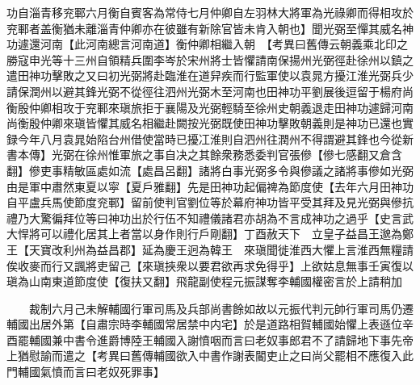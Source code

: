 功自淄青移兖鄆六月衡自賓客為常侍七月仲卿自左羽林大將軍為光祿卿而得相攻於兖鄆者盖衡猶未離淄青仲卿亦在彼雖有新除官皆未肯入朝也】聞光弼至憚其威名神功遽還河南【此河南總言河南道】衡仲卿相繼入朝　【考異曰舊傳云朝義乘北印之勝寇申光等十三州自領精兵圍李岑於宋州將士皆懼請南保揚州光弼徑赴徐州以鎮之遣田神功擊敗之又曰初光弼將赴臨淮在道舁疾而行監軍使以袁晁方擾江淮光弼兵少請保潤州以避其鋒光弼不從徑往泗州光弼木至河南也田神功平劉展後逗留于楊府尚衡殷仲卿相攻于兖鄆來瑱旅拒于襄陽及光弼輕騎至徐州史朝義退走田神功遽歸河南尚衡殷仲卿來瑱皆懼其威名相繼赴闕按光弼既使田神功擊敗朝義則是神功已還也實録今年八月袁晁始陷台州借使當時已擾冮淮則自泗州往潤州不得謂避其鋒也今從新書本傳】光弼在徐州惟軍旅之事自决之其餘衆務悉委判官張傪【傪七感翻又倉含翻】傪吏事精敏區處如流【處昌呂翻】諸將白事光弼多令與傪議之諸將事傪如光弼由是軍中肅然東夏以寜【夏戶雅翻】先是田神功起偏禆為節度使【去年六月田神功自平盧兵馬使節度兖鄆】留前使判官劉位等於幕府神功皆平受其拜及見光弼與傪抗禮乃大驚徧拜位等曰神功出於行伍不知禮儀諸君亦胡為不言成神功之過乎【史言武大悍將可以禮化居其上者當以身作則行戶剛翻】丁酉赦天下　立皇子益昌王邈為鄭王【天寶改利州為益昌郡】延為慶王迥為韓王　來瑱聞徙淮西大懼上言淮西無糧請俟收麥而行又諷將吏留己【來瑱挾衆以要君欲再求免得乎】上欲姑息無事壬寅復以瑱為山南東道節度使【復扶又翻】飛龍副使程元振謀奪李輔國權密言於上請稍加

　　裁制六月己未解輔國行軍司馬及兵部尚書餘如故以元振代判元帥行軍司馬仍遷輔國出居外第【自肅宗時李輔國常居禁中内宅】於是道路相賀輔國始懼上表遜位辛酉罷輔國兼中書令進爵博陸王輔國入謝憤咽而言曰老奴事郎君不了請歸地下事先帝上猶慰諭而遣之【考異曰舊傳輔國欲入中書作謝表閽吏止之曰尚父罷相不應復入此門輔國氣憤而言曰老奴死罪事】

